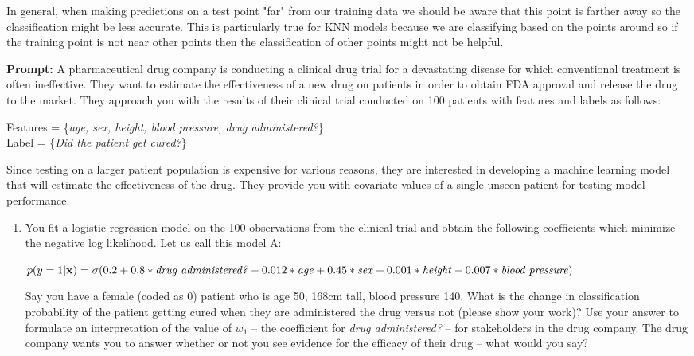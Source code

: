 \documentclass[submit]{harvardml}
\begin{document}
\begin{enumerate}
     In general, when making predictions on a test point "far" from our training data we should be aware that this point is farther away so the classification might be less accurate. This is particularly true for KNN models because we are classifying based on the points around so if the training point is not near other points then the classification of other points might not be helpful.
\end{enumerate}


\begin{problem}

\textbf{Prompt:} A pharmaceutical drug company is conducting a clinical drug trial for a devastating disease for which conventional treatment is often ineffective. They want to estimate the effectiveness of a new drug on patients in order to obtain FDA approval and release the drug to the market. They approach you with the results of their clinical trial conducted on 100 patients with features and labels as follows:

Features = \{\textit{age, sex, height, blood pressure, drug administered?}\} \\
Label = \{\textit{Did the patient get cured?}\}

Since testing on a larger patient population is expensive for various reasons, they are interested in developing a machine learning model that will estimate the effectiveness of the drug. They provide you with covariate values of a single unseen patient for testing model performance. 

\begin{enumerate}
    \item You fit a logistic regression model on the 100 observations from the clinical trial and obtain the following coefficients which minimize the negative log likelihood. Let us call this model A:

    $p(y=1 | \mathbf{x}) = \sigma(0.2 + 0.8 *\text{\textit{drug administered?}} - 0.012 *\text{\textit{age}} + 0.45*\text{\textit{sex}} +  0.001*\text{\textit{height}} - 0.007*\text{\textit{blood pressure}})$

    Say you have a female (coded as 0) patient who is age 50, 168cm tall, blood pressure 140. What is the change in classification probability of the patient getting cured when they are administered the drug versus not (please show your work)?  Use your answer to formulate an interpretation of the value of $w_1$ -- the coefficient for \textit{drug administered?} -- for stakeholders in the drug company. The drug company wants you to answer whether or not you see evidence for the efficacy of their drug -- what would you say?


\end{enumerate}
\end{problem}
\end{document}
